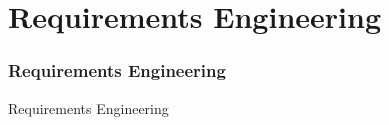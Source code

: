 
\section{Requirements Engineering}
\begin{frame}[fragile]
	\frametitle{Requirements Engineering}
\huge Requirements Engineering
\end{frame}
